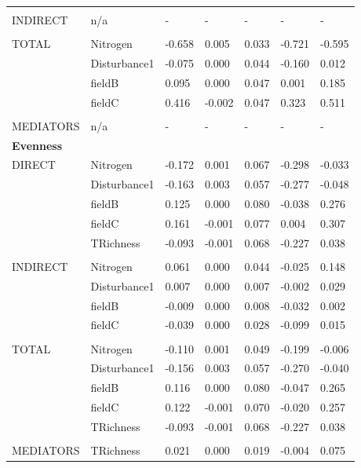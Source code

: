 \begin{longtable}[c]{l l l l l l l }
 & & & & & & \\
 INDIRECT & n/a & - & - & - & - & -\\
 & & & & & & \\
 TOTAL & Nitrogen & -0.658 & 0.005 & 0.033 & -0.721 & -0.595\\
 & Disturbance1 & -0.075 & 0.000 & 0.044 & -0.160 & 0.012\\
 & fieldB & 0.095 & 0.000 & 0.047 & 0.001 & 0.185\\
 & fieldC & 0.416 & -0.002 & 0.047 & 0.323 & 0.511\\
 & & & & & & \\
 MEDIATORS &n/a & - & - & - & - & -\\
\textbf{Evenness} &  &  &  &  &  &\\
\hline
 DIRECT & Nitrogen & -0.172 & 0.001 & 0.067 & -0.298 & -0.033\\
 & Disturbance1 & -0.163 & 0.003 & 0.057 & -0.277 & -0.048\\
 & fieldB & 0.125 & 0.000 & 0.080 & -0.038 & 0.276\\
 & fieldC & 0.161 & -0.001 & 0.077 & 0.004 & 0.307\\
 & TRichness & -0.093 & -0.001 & 0.068 & -0.227 & 0.038\\
 & & & & & & \\
 INDIRECT & Nitrogen & 0.061 & 0.000 & 0.044 & -0.025 & 0.148\\
 & Disturbance1 & 0.007 & 0.000 & 0.007 & -0.002 & 0.029\\
 & fieldB & -0.009 & 0.000 & 0.008 & -0.032 & 0.002\\
 & fieldC & -0.039 & 0.000 & 0.028 & -0.099 & 0.015\\
 & & & & & & \\
 TOTAL & Nitrogen & -0.110 & 0.001 & 0.049 & -0.199 & -0.006\\
 & Disturbance1 & -0.156 & 0.003 & 0.057 & -0.270 & -0.040\\
 & fieldB & 0.116 & 0.000 & 0.080 & -0.047 & 0.265\\
 & fieldC & 0.122 & -0.001 & 0.070 & -0.020 & 0.257\\
 & TRichness & -0.093 & -0.001 & 0.068 & -0.227 & 0.038\\
 & & & & & & \\
 MEDIATORS &TRichness & 0.021 & 0.000 & 0.019 & -0.004 & 0.075\\
\end{longtable}
